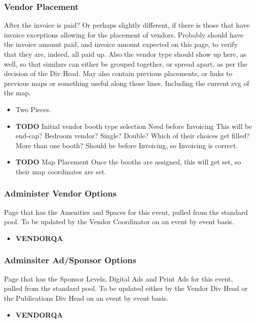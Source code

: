 \documentclass[captions=tablesignature]{scrartcl}
\begin{document}
\subsubsection{Vendor Placement}
\label{sec-3-1-12}
After the invoice is paid? Or perhaps slightly different, if there
is those that have invoice exceptions allowing for the placement
of vendors.  Probably should have the invoice amount paid, and
invoice amount expected on this page, to verify that they are,
indeed, all paid up.  Also the vendor type should show up here, as
well, so that similars can either be grouped together, or spread
apart, as per the decision of the Div Head. May also contain
previous placements, or links to previous maps or something useful
along those lines.  Including the current svg of the map.
\begin{itemize}
\item Two Pieces.
\end{itemize}
\begin{itemize}
\item {\bfseries\sffamily TODO} Initial vendor booth type selection  Need before Invoicing
\label{sec-3-1-12-1}
This will be end-cap?  Bedroom vendor?  Single?  Double? Which of
their choices get filled? More than one booth? Should be before
Invoicing, so Invoicing is correct.

\item {\bfseries\sffamily TODO} Map Placement
\label{sec-3-1-12-2}
Once the booths are assigned, this will get set, so their map
coordinates are set.
\end{itemize}

\subsubsection{Administer Vendor Options}
\label{sec-3-1-13}
Page that has the Amenities and Spaces for this event, pulled from
the standard pool.  To be updated by the Vendor Coordinator on an
event by event basis.
\begin{itemize}
\item {\bfseries\sffamily VENDORQA} 
\label{sec-3-1-13-1}
\end{itemize}

\subsubsection{Adminsiter Ad/Sponsor Options}
\label{sec-3-1-14}
Page that has the Sponsor Levels, Digital Ads and Print Ads for
this event, pulled from the standard pool.  To be updated either
by the Vendor Div Head or the Publications Div Head on an event by
event basis.
\begin{itemize}
\item {\bfseries\sffamily VENDORQA} 
\label{sec-3-1-14-1}
\end{itemize}
\end{document}

